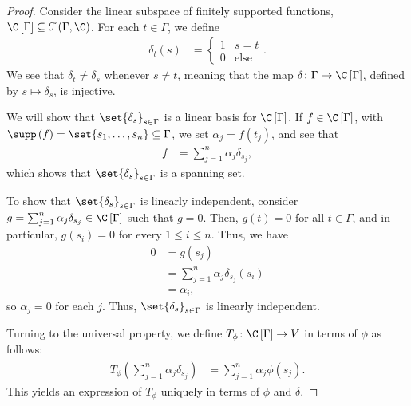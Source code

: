 \begin{proof}
  Consider the linear subspace of finitely supported functions, $\C\left[\Gamma\right]\subseteq \mathcal{F}\left(\Gamma,\C\right)$. For each $t\in \Gamma$, we define
  \begin{align*}
    \delta_t\left(s\right) &= \begin{cases}
      1 & s=t\\
      0 & \text{else}
    \end{cases}.
  \end{align*}
    We see that $\delta_t\neq \delta_s$ whenever $s\neq t$, meaning that the map $\delta\colon \Gamma\rightarrow \C\left[\Gamma\right]$, defined by $s \mapsto \delta_s$, is injective.\newline

    We will show that $\set{\delta_s}_{s\in \Gamma}$ is a linear basis for $\C\left[\Gamma\right]$. If $f\in \C\left[\Gamma\right]$, with $\supp\left(f\right) = \set{s_1,\dots,s_n}\subseteq \Gamma$, we set $\alpha_j = f\left(t_j\right)$, and see that
    \begin{align*}
      f &= \sum_{j=1}^{n}\alpha_j\delta_{s_j},
    \end{align*}
    which shows that $\set{\delta_s}_{s\in\Gamma}$ is a spanning set.\newline

    To show that $\set{\delta_s}_{s\in\Gamma}$ is linearly independent, consider $g = \sum_{j=1}^{n}\alpha_j\delta_{s_j}\in \C\left[\Gamma\right]$ such that $g = 0$. Then, $g(t) = 0$ for all $t\in\Gamma$, and in particular, $g\left(s_i\right) = 0$ for every $1 \leq i \leq n$. Thus, we have
    \begin{align*}
      0 &= g\left(s_j\right)\\
        &= \sum_{j=1}^{n}\alpha_j\delta_{s_j}\left(s_i\right)\\
        &= \alpha_i,
    \end{align*}
    so $\alpha_j = 0$ for each $j$. Thus, $\set{\delta_s}_{s\in \Gamma}$ is linearly independent.\newline

    Turning to the universal property, we define $T_{\phi}\colon \C\left[\Gamma\right]\rightarrow V$ in terms of $\phi$ as follows:
    \begin{align*}
      T_{\phi}\left(\sum_{j=1}^{n}\alpha_j\delta_{s_j}\right) &= \sum_{j=1}^{n}\alpha_j\phi\left(s_j\right).
    \end{align*}
    This yields an expression of $T_{\phi}$ uniquely in terms of $\phi$ and $\delta$.
\end{proof}
